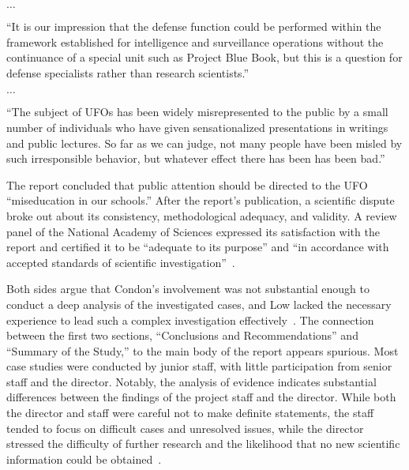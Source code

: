 \begin{svgraybox}
$\ldots$

``It is our impression that the defense function could be performed within the framework
established for intelligence and surveillance operations without the continuance of a special unit such as Project Blue Book,
but this is a question for defense specialists rather than research scientists.''



$\ldots$

``The subject of UFOs has been widely misrepresented to the public by a small number of individuals who have given sensationalized presentations
in writings and public lectures.
So far as we can judge, not many people have been misled by such irresponsible behavior,
but whatever effect there has been has been bad.''
\end{svgraybox}

The report concluded that public attention should be directed to the UFO ``miseducation in our schools.'' After the report's publication, a scientific dispute broke out about its consistency, methodological adequacy, and validity. A review panel of the National Academy of Sciences expressed its satisfaction with the report and certified it to be ``adequate to its purpose'' and ``in accordance with accepted standards of scientific investigation''~\cite{PNAS-Condon-1969}.

Both sides argue that Condon's involvement was not substantial enough to conduct a deep analysis of the investigated cases, and Low lacked the necessary experience to lead such a complex investigation effectively~\cite{Klass2019Apr}. The connection between the first two sections, ``Conclusions and Recommendations'' and ``Summary of the Study,'' to the main body of the report appears spurious. Most case studies were conducted by junior staff, with little participation from senior staff and the director. Notably, the analysis of evidence indicates substantial differences between the findings of the project staff and the director. While both the director and staff were careful not to make definite statements, the staff tended to focus on difficult cases and unresolved issues, while the director stressed the difficulty of further research and the likelihood that no new scientific information could be obtained~\cite{Sturrock-Condon-87}.

